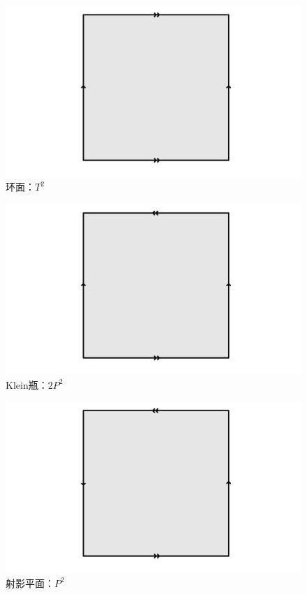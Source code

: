 \documentclass[lang = cn, scheme = chinese, thmcnt = section, usesamecnt]{elegantbook}
\begin{document}
\begin{figure}[H]
	\centering
	\caption{环面：$T^2$}
	\includegraphics[scale = 0.15]{figure/环面}
\end{figure}

\begin{figure}[H]
	\centering
	\caption{Klein瓶：$2P^2$}
	\includegraphics[scale = 0.15]{figure/Klein瓶}
\end{figure}

\begin{figure}[H]
	\centering
	\caption{射影平面：$P^2$}
	\includegraphics[scale = 0.15]{figure/射影平面}
\end{figure}
\end{document}
